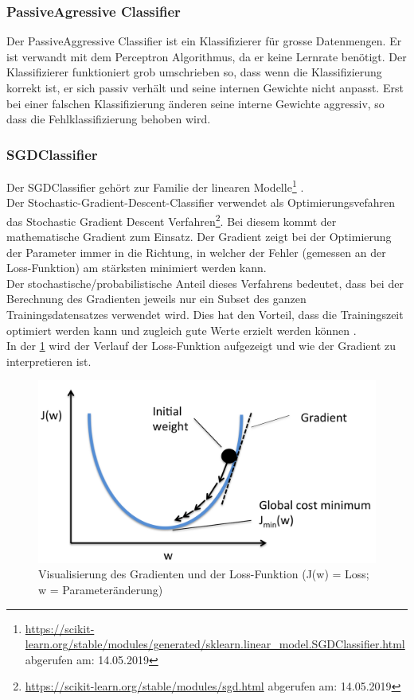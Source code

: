 \subsubsection{PassiveAgressive Classifier}
Der PassiveAggressive Classifier ist ein Klassifizierer für grosse Datenmengen.
Er ist verwandt mit dem Perceptron Algorithmus, da er keine Lernrate benötigt.
Der Klassifizierer funktioniert grob umschrieben so, dass wenn die Klassifizierung korrekt ist, er sich passiv verhält und seine internen Gewichte nicht anpasst.
Erst bei einer falschen Klassifizierung änderen seine interne Gewichte aggressiv, so dass die Fehlklassifizierung behoben wird. \cite{crammer2006online}
\subsubsection{SGDClassifier}
Der SGDClassifier gehört zur Familie der linearen Modelle\footnote{\url{https://scikit-learn.org/stable/modules/generated/sklearn.linear_model.SGDClassifier.html} abgerufen am: 14.05.2019} \cite{scikit-learn}.\\
Der \glqq Stochastic-Gradient-Descent-Classifier\grqq{} verwendet als Optimierungsvefahren das \glqq Stochastic Gradient Descent\grqq{} Verfahren\footnote{\url{https://scikit-learn.org/stable/modules/sgd.html} abgerufen am: 14.05.2019}.
Bei diesem kommt der mathematische Gradient zum Einsatz.
Der Gradient zeigt bei der Optimierung der Parameter immer in die Richtung, in welcher der Fehler (gemessen an der Loss-Funktion) am stärksten minimiert werden kann.\\
Der stochastische/probabilistische Anteil dieses Verfahrens bedeutet, dass bei der Berechnung des Gradienten jeweils nur ein Subset des ganzen Trainingsdatensatzes verwendet wird.
Dies hat den Vorteil, dass die Trainingszeit optimiert werden kann und zugleich gute Werte erzielt werden können \cite{lecun2012efficient}.\\
In der \cref{fig:sgd} wird der Verlauf der Loss-Funktion aufgezeigt und wie der Gradient zu interpretieren ist.
\begin{figure}[H]
	\centering	
	\includegraphics[width=0.7\columnwidth,keepaspectratio]{img/sgd.png}
	\caption{Visualisierung des Gradienten und der Loss-Funktion (J(w) = Loss; w = Parameteränderung)}
	\label{fig:sgd}
\end{figure}
